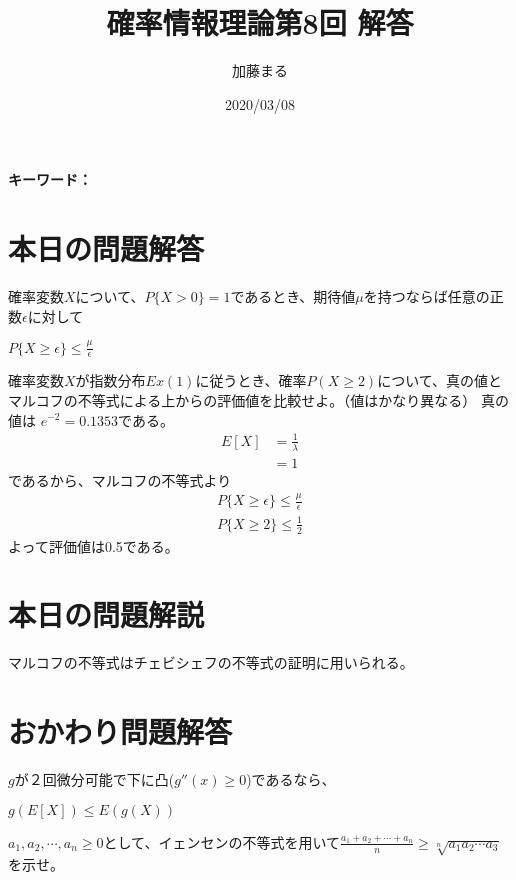 \documentclass[a4j,uplatex,dvipdfmx]{jsarticle}
\title{確率情報理論第8回 解答}
\author{加藤まる}
\date{2020/03/08}
\begin{document}
\maketitle
\bf キーワード：
\rm

\section*{本日の問題解答}
\begin{tcolorbox}[
  title = マルコフの不等式,
  ]
    確率変数$X$について、$P\{ X>0 \}=1$であるとき、期待値$\mu$を持つならば任意の正数$\epsilon$に対して
    \begin{center}
      $P\{ X\ge \epsilon \} \le \frac{\mu}{\epsilon}$
    \end{center}
  \end{tcolorbox}
確率変数$X$が指数分布$Ex(1)$に従うとき、確率$P(X\ge 2)$について、真の値とマルコフの不等式による上からの評価値を比較せよ。（値はかなり異なる）
真の値は $e^{-2} = 0.1353$である。\\
\begin{equation}
  \begin{split}
    E[X] &= \frac{1}{\lambda}\\
    &= 1
  \end{split}
\end{equation}
であるから、マルコフの不等式より
\begin{equation}
  \begin{split}
    P\{ X\ge \epsilon \} \le \frac{\mu}{\epsilon} \\ 
    P\{ X\ge 2 \} \le \frac{1}{2}
  \end{split}
\end{equation}
よって評価値は0.5である。

\section*{本日の問題解説}
マルコフの不等式はチェビシェフの不等式の証明に用いられる。

\newpage
\section*{おかわり問題解答}
\begin{tcolorbox}[
  title = イェンセンの不等式,
  ]
      $g$が２回微分可能で下に凸($g''(x)\ge 0$)であるなら、
      \begin{center}
        $g(E[X])\le E(g(X))$
      \end{center}
  \end{tcolorbox}
$a_1,a_2,\cdots ,a_n \ge 0$として、イェンセンの不等式を用いて$\displaystyle \frac{a_1+a_2+\cdots +a_n}{n}\ge \sqrt[n]{a_1a_2\cdots a_3}$\\を示せ。
\end{document}
